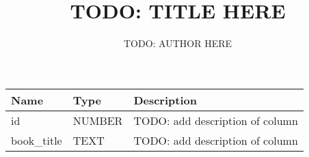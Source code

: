 \documentclass[10pt,a4paper]{article}
\title{TODO: TITLE HERE}
\author{TODO: AUTHOR HERE}
\begin{document}
\maketitle

\begin{tabularx}{\textwidth}{llX}
\toprule
\textbf{Name} & \textbf{Type} & \textbf{Description}\\
\midrule
id & NUMBER & TODO: add description of column\\
book\_title & TEXT & TODO: add description of column\\
\bottomrule
\end{tabularx}
\end{document}
